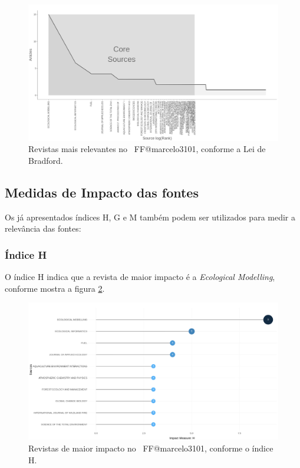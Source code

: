 \begin{figure}
    \centering
    \includegraphics[width=1\textwidth]{exploratory-data-analysis/marcelo3101/PesqBibliogr/ForestFire/WoS-20221204/assets/bradfordsLawFFmarcelo3101.png}
    \caption{Revistas mais relevantes no  \dataset\ FF@marcelo3101, conforme a Lei de Bradford.}
    \label{fig:FF@marcelo3101:Bradfords-Law.png}
\end{figure}

\subsection{Medidas de Impacto das fontes}

Os já apresentados índices H, G e M também podem ser utilizados para medir a relevância das fontes:

\subsubsection{Índice H}

O índice H indica que a revista de maior impacto é a \textit{Ecological Modelling}, conforme mostra a figura \ref{fig:FF@marcelo3101:H-Index-Source-Local-Impact.png}.

\begin{figure}
    \centering
    \includegraphics[width=1\textwidth]{exploratory-data-analysis/marcelo3101/PesqBibliogr/ForestFire/WoS-20221204/assets/SourceImpactHindex.png}
    \caption{Revistas de maior impacto no  \dataset\ FF@marcelo3101,  conforme o índice H.}
    \label{fig:FF@marcelo3101:H-Index-Source-Local-Impact.png}
\end{figure}


